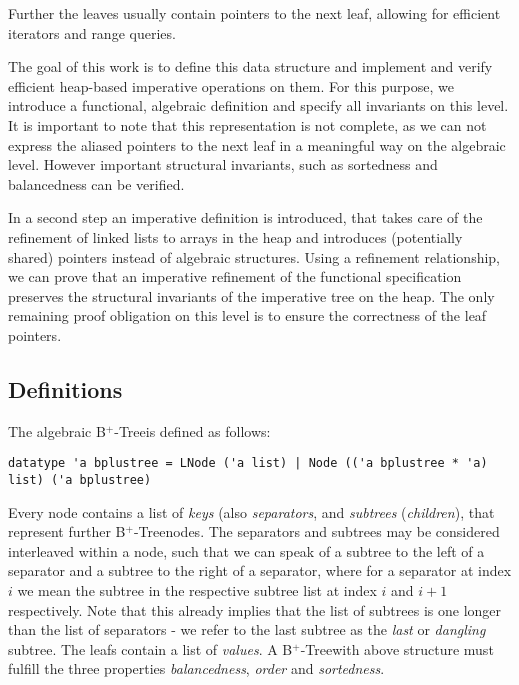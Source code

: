 \documentclass[a4paper,UKenglish,cleveref, autoref, thm-restate]{lipics-v2021}
\newcommand{\btree}{B$^+$-Tree}
\begin{document}
Further the leaves usually contain pointers
to the next leaf, allowing for efficient iterators and range queries.

The goal of this work is to define this data structure
and implement and verify efficient heap-based imperative operations on them.
For this purpose, we introduce a functional, algebraic definition and
specify all invariants on this level.
It is important to note that this representation is not complete,
as we can not express the aliased pointers to the next leaf in a meaningful
way on the algebraic level.
However important structural invariants, such as sortedness and balancedness
can be verified.

In a second step an imperative definition is introduced,
that takes care of the refinement of linked lists to arrays in the heap
and introduces (potentially shared) pointers instead of algebraic structures.
Using a refinement relationship, we can prove that an imperative refinement
of the functional specification preserves the structural invariants
of the imperative tree on the heap.
The only remaining proof obligation on this level is to ensure the correctness
of the leaf pointers.


\subsection{Definitions}
\label{sec:data_structure_defs}


The algebraic \btree is defined as follows:

\begin{lstlisting}[mathescape=true, language=Isabelle,label=lst:btree-def]
    datatype 'a bplustree = LNode ('a list) | Node (('a bplustree * 'a) list) ('a bplustree)
\end{lstlisting}

Every node contains a list of \textit{keys} (also \textit{separators}, and \textit{subtrees} (\textit{children}),
that represent further \btree nodes.
The separators and subtrees may be considered interleaved within a node,
such that we can speak of a subtree to the left of a separator and
a subtree to the right of a separator,
where for a separator at index $i$ we mean the subtree in the respective
subtree list at index $i$ and $i+1$ respectively.
Note that this already implies that the list of subtrees is one
longer than the list of separators - we refer to the last subtree
as the \textit{last} or \textit{dangling} subtree.
The leafs contain a list of \textit{values}.
A \btree with above structure must fulfill the three properties
\textit{balancedness}, \textit{order} and \textit{sortedness}.
\end{document}

